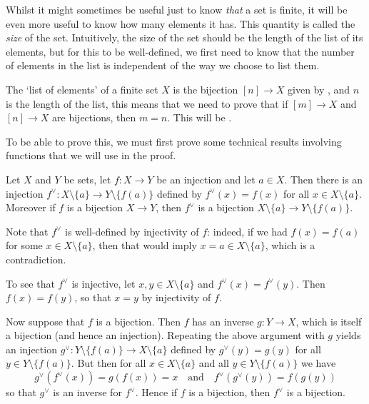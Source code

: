 Whilst it might sometimes be useful just to know \textit{that} a set is finite, it will be even more useful to know how many elements it has. This quantity is called the \textit{size} of the set. Intuitively, the size of the set should be the length of the list of its elements, but for this to be well-defined, we first need to know that the number of elements in the list is independent of the way we choose to list them.

The `list of elements' of a finite set $X$ is the bijection $[n] \to X$ given by , and $n$ is the length of the list, this means that we need to prove that if $[m] \to X$ and $[n] \to X$ are bijections, then $m=n$. This will be .

To be able to prove this, we must first prove some technical results involving functions that we will use in the proof.

\begin{lemma}
\label{lemRemoveElementFromDomainAndCodomain}
Let $X$ and $Y$ be sets, let $f : X \to Y$ be an injection and let $a \in X$. Then there is an injection $f^{\vee} : X \setminus \{ a \} \to Y \setminus \{ f(a) \}$ defined by $f^{\vee}(x) = f(x)$ for all $x \in X \setminus \{ a \}$. Moreover if $f$ is a bijection $X \to Y$, then $f^{\vee}$ is a bijection $X \setminus \{ a \} \to Y \setminus \{ f(a) \}$.
\end{lemma}

\begin{cproof}
Note that $f^{\vee}$ is well-defined by injectivity of $f$: indeed, if we had $f(x) = f(a)$ for some $x \in X \setminus \{ a \}$, then that would imply $x=a \in X \setminus \{ a \}$, which is a contradiction.

To see that $f^{\vee}$ is injective, let $x,y \in X \setminus \{ a \}$ and $f^{\vee}(x) = f^{\vee}(y)$. Then $f(x) = f(y)$, so that $x=y$ by injectivity of $f$.

Now suppose that $f$ is a bijection. Then $f$ has an inverse $g : Y \to X$, which is itself a bijection (and hence an injection). Repeating the above argument with $g$ yields an injection $g^{\vee} : Y \setminus \{ f(a) \} \to X \setminus \{ a \}$ defined by $g^{\vee}(y) = g(y)$ for all $y \in Y \setminus \{ f(a) \}$. But then for all $x \in X \setminus \{ a \}$ and all $y \in Y \setminus \{ f(a) \}$ we have
\[ g^{\vee}(f^{\vee}(x)) = g(f(x)) = x \quad \text{and} \quad f^{\vee}(g^{\vee}(y)) = f(g(y)) \]
so that $g^{\vee}$ is an inverse for $f^{\vee}$. Hence if $f$ is a bijection, then $f^{\vee}$ is a bijection.
\end{cproof}


